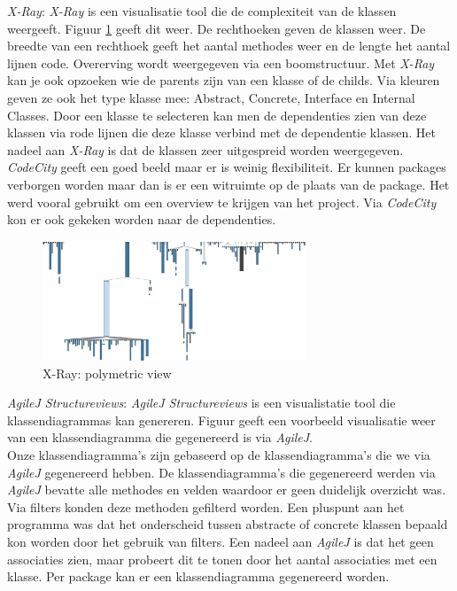 \documentclass[i1]{oss}
\begin{document}
\begin{description}


\item \emph{X-Ray}: \emph{X-Ray} is een visualisatie tool die de complexiteit van de klassen weergeeft. Figuur \ref{fig:X-Ray} geeft dit weer. De rechthoeken geven de klassen weer. De breedte van een rechthoek geeft het aantal methodes weer en de lengte het aantal lijnen code. Overerving wordt weergegeven via een boomstructuur. Met \emph{X-Ray }kan je ook opzoeken wie de parents zijn van een klasse of de childs. Via kleuren geven ze ook het type klasse mee: Abstract, Concrete, Interface en Internal Classes. Door een klasse te selecteren kan men de dependenties zien van deze klassen via rode lijnen die deze klasse verbind met de dependentie klassen. Het nadeel aan \emph{X-Ray} is dat de klassen zeer uitgespreid worden weergegeven. \\
\emph{CodeCity} geeft een goed beeld maar er is weinig flexibiliteit. Er kunnen packages verborgen worden maar dan is er een witruimte op de plaats van de package. Het werd vooral gebruikt om een overview te krijgen van het project. Via \emph{CodeCity} kon er ook gekeken worden naar de dependenties. 


\begin{figure}[hb!]
	\centering
	\includegraphics[width=0.70\textwidth]{XRayComplexity}
	\caption{X-Ray: polymetric view}
	\label{fig:X-Ray}
\end{figure}

\item \emph{AgileJ Structureviews}: \emph{AgileJ Structureviews} is een visualistatie tool die klassendiagrammas kan genereren. Figuur \label{fig:AgileJklassendia} geeft een voorbeeld visualisatie weer van een klassendiagramma die gegenereerd is via \emph{AgileJ}.\\
Onze klassendiagramma's zijn gebaseerd op de klassendiagramma's die we via \emph{AgileJ} gegenereerd hebben. De klassendiagramma's die gegenereerd werden via \emph{AgileJ} bevatte alle methodes en velden waardoor er geen duidelijk overzicht was. Via filters konden deze methoden gefilterd worden. Een pluspunt aan het programma was dat het onderscheid tussen abstracte of concrete klassen bepaald kon worden door het gebruik van filters.  Een nadeel aan \emph{AgileJ} is dat het geen associaties zien, maar probeert dit te tonen door het aantal associaties met een klasse. Per package kan er een klassendiagramma gegenereerd worden. 



\end{description}
\end{document}
